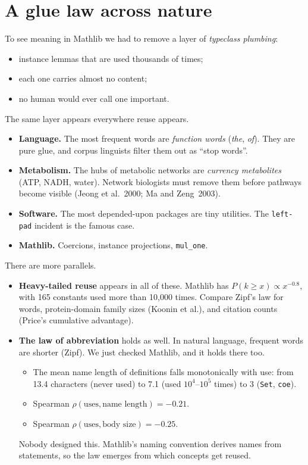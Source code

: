 \documentclass[11pt]{article}
\begin{document}
\section{A glue law across nature}

To see meaning in Mathlib we had to remove a layer of \emph{typeclass plumbing}:
\begin{itemize}
\item instance lemmas that are used thousands of times;
\item each one carries almost no content;
\item no human would ever call one important.
\end{itemize}
The same layer appears everywhere reuse appears.
\begin{itemize}
\item \textbf{Language.} The most frequent words are \emph{function words} (\emph{the},
  \emph{of}). They are pure glue, and corpus linguists filter them out as ``stop words''.
\item \textbf{Metabolism.} The hubs of metabolic networks are \emph{currency metabolites}
  (ATP, NADH, water). Network biologists must remove them before pathways become visible
  (Jeong et al.~2000; Ma and Zeng~2003).
\item \textbf{Software.} The most depended-upon packages are tiny utilities. The
  \texttt{left-pad} incident is the famous case.
\item \textbf{Mathlib.} Coercions, instance projections, \texttt{mul\_one}.
\end{itemize}

There are more parallels.
\begin{itemize}
\item \textbf{Heavy-tailed reuse} appears in all of these. Mathlib has
  $P(k\ge x)\propto x^{-0.8}$, with 165 constants used more than 10{,}000 times. Compare
  Zipf's law for words, protein-domain family sizes (Koonin et al.), and citation counts
  (Price's cumulative advantage).
\item \textbf{The law of abbreviation} holds as well. In natural language, frequent words
  are shorter (Zipf). We just checked Mathlib, and it holds there too.
  \begin{itemize}
  \item The mean name length of definitions falls monotonically with use: from 13.4
    characters (never used) to 7.1 (used $10^4$--$10^5$ times) to 3 (\texttt{Set},
    \texttt{coe}).
  \item Spearman $\rho(\text{uses},\text{name length})=-0.21$.
  \item Spearman $\rho(\text{uses},\text{body size})=-0.25$.
  \end{itemize}
  Nobody designed this. Mathlib's naming convention derives names from statements, so the
  law emerges from which concepts get reused.
\end{itemize}
\end{document}
